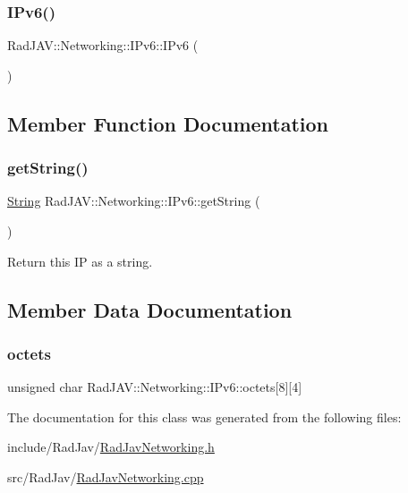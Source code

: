 \subsubsection{\texorpdfstring{I\+Pv6()}{IPv6()}}
{\footnotesize\ttfamily Rad\+J\+A\+V\+::\+Networking\+::\+I\+Pv6\+::\+I\+Pv6 (\begin{DoxyParamCaption}{ }\end{DoxyParamCaption})}



\subsection{Member Function Documentation}
\mbox{\label{class_rad_j_a_v_1_1_networking_1_1_i_pv6_afb1cd31e07ca3da8f952207a509db5b8}} 
\subsubsection{\texorpdfstring{get\+String()}{getString()}}
{\footnotesize\ttfamily \mbox{\hyperlink{class_rad_j_a_v_1_1_string}{String}} Rad\+J\+A\+V\+::\+Networking\+::\+I\+Pv6\+::get\+String (\begin{DoxyParamCaption}{ }\end{DoxyParamCaption})}

Return this IP as a string. 

\subsection{Member Data Documentation}
\mbox{\label{class_rad_j_a_v_1_1_networking_1_1_i_pv6_afc515bb7d6bce74a4d39c900e41924d3}} 
\subsubsection{\texorpdfstring{octets}{octets}}
{\footnotesize\ttfamily unsigned char Rad\+J\+A\+V\+::\+Networking\+::\+I\+Pv6\+::octets\mbox{[}8\mbox{]}\mbox{[}4\mbox{]}}



The documentation for this class was generated from the following files\+:\begin{DoxyCompactItemize}
\item 
include/\+Rad\+Jav/\mbox{\hyperlink{_rad_jav_networking_8h}{Rad\+Jav\+Networking.\+h}}\item 
src/\+Rad\+Jav/\mbox{\hyperlink{_rad_jav_networking_8cpp}{Rad\+Jav\+Networking.\+cpp}}\end{DoxyCompactItemize}
